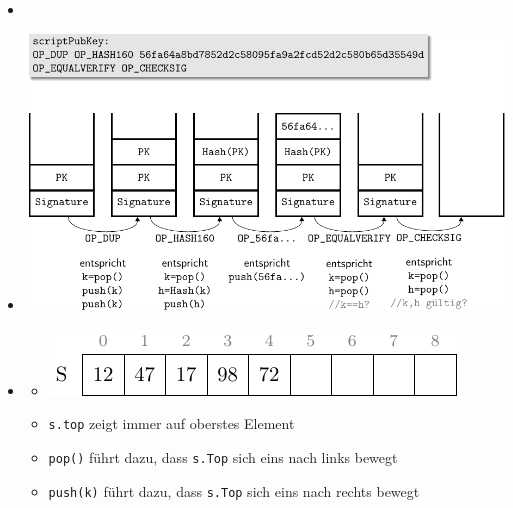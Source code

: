 \documentclass[
    12pt,
    a4paper,
    ngerman,
    color=3b,%
    marginpar=false,
    colorback=false,
    leqno,
]{tudaexercise}
\begin{document}
\begin{itemize}
    \item {}
    \item[] \includegraphics[width=15cm]{pictures/bitcoin_stack_example/bitcoin_stack_example}
          \clearpage
    \item {}
          \begin{itemize}
              \item[] \includegraphics[]{pictures/staack_als_array/stack_als_array}
              \item \texttt{s.top} zeigt immer auf oberstes Element
              \item \texttt{pop()} führt dazu, dass \texttt{s.Top} sich eins nach links bewegt
              \item \texttt{push(k)} führt dazu, dass \texttt{s.Top} sich eins nach rechts bewegt
          \end{itemize}


\end{itemize}
\end{document}
